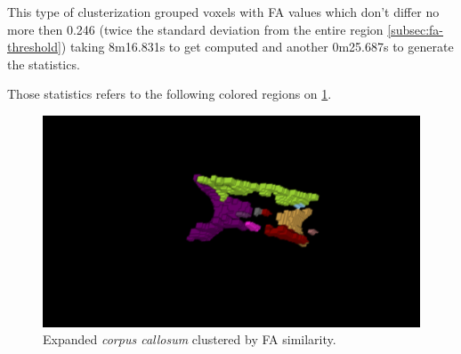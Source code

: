 \documentclass[a4paper,11pt]{report}
\begin{document}
    This type of clusterization grouped voxels with FA values which don't differ no more then 0.246 (twice the standard deviation from the entire region \ref{subsec:fa-threshold}) taking 8m16.831s to get computed and another 0m25.687s to generate the statistics.

    Those statistics refers to the following colored regions on \ref{fig:fa-regions}.

    \begin{figure}[!ht]
      \includegraphics[width=1\linewidth]{img/regions/fa_regions.png}
      \caption{Expanded \textit{corpus callosum} clustered by FA similarity.}
      \label{fig:fa-regions}
    \end{figure}

    \newpage
\end{document}
